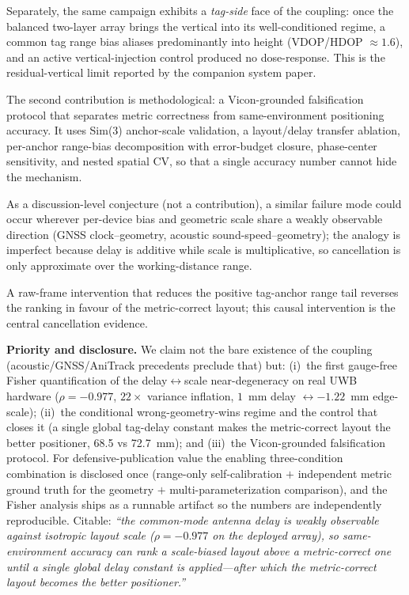 \documentclass[10pt,a4paper]{article}
\begin{document}
Separately, the same campaign exhibits a \emph{tag-side} face of the coupling: once the balanced two-layer array brings the vertical into its well-conditioned regime, a common tag range bias aliases predominantly into height (VDOP/HDOP $\approx 1.6$), and an active vertical-injection control produced no dose-response. This is the residual-vertical limit reported by the companion system paper.

The second contribution is methodological: a Vicon-grounded falsification protocol that separates metric correctness from same-environment positioning accuracy. It uses Sim(3) anchor-scale validation, a layout/delay transfer ablation, per-anchor range-bias decomposition with error-budget closure, phase-center sensitivity, and nested spatial CV, so that a single accuracy number cannot hide the mechanism.

As a discussion-level conjecture (not a contribution), a similar failure mode could occur wherever per-device bias and geometric scale share a weakly observable direction (GNSS clock--geometry, acoustic sound-speed--geometry); the analogy is imperfect because delay is additive while scale is multiplicative, so cancellation is only approximate over the working-distance range.

A raw-frame intervention that reduces the positive tag-anchor range tail reverses the ranking in favour of the metric-correct layout; this causal intervention is the central cancellation evidence.

\textbf{Priority and disclosure.} We claim not the bare existence of the coupling (acoustic/GNSS/AniTrack precedents preclude that) but: (i)~the first gauge-free Fisher quantification of the delay$\leftrightarrow$scale near-degeneracy on real UWB hardware ($\rho=-0.977$, $22\times$ variance inflation, $1$~mm delay $\leftrightarrow -1.22$~mm edge-scale); (ii)~the conditional wrong-geometry-wins regime and the control that closes it (a single global tag-delay constant makes the metric-correct layout the better positioner, 68.5 vs 72.7~mm); and (iii)~the Vicon-grounded falsification protocol. For defensive-publication value the enabling three-condition combination is disclosed once (range-only self-calibration $+$ independent metric ground truth for the geometry $+$ multi-parameterization comparison), and the Fisher analysis ships as a runnable artifact so the numbers are independently reproducible. Citable: \emph{``the common-mode antenna delay is weakly observable against isotropic layout scale ($\rho=-0.977$ on the deployed array), so same-environment accuracy can rank a scale-biased layout above a metric-correct one until a single global delay constant is applied---after which the metric-correct layout becomes the better positioner.''}
\end{document}
